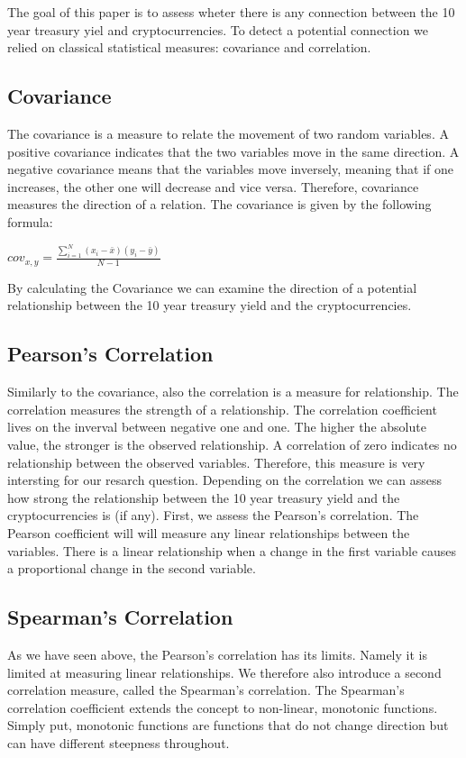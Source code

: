 The goal of this paper is to assess wheter there is any connection between the 10 year treasury yiel and cryptocurrencies. To detect a potential connection we relied on classical statistical measures: covariance and correlation.

\subsection{Covariance}
The covariance is a measure to relate the movement of two random variables. A positive covariance indicates that the two variables move in the same direction. A negative covariance means that the variables move inversely, meaning that if one increases, the other one will decrease and vice versa. Therefore, covariance measures the direction of a relation. The covariance is given by the following formula:
\begin{center}
   \large $cov_{x,y}=\frac{\sum_{i=1}^{N}(x_{i}-\bar{x})(y_{i}-\bar{y})}{N-1}$
\end{center}
By calculating the Covariance we can examine the direction of a potential relationship between the 10 year treasury yield and the cryptocurrencies.

\subsection{Pearson's Correlation}
Similarly to the covariance, also the correlation is a measure for relationship. The correlation measures the strength of a relationship. The correlation coefficient lives on the inverval between negative one and one. The higher the absolute value, the stronger is the observed relationship. A correlation of zero indicates no relationship between the observed variables. Therefore, this measure is very intersting for our resarch question. Depending on the correlation we can assess how strong the relationship between the 10 year treasury yield and the cryptocurrencies is (if any).
First, we assess the Pearson's correlation. The Pearson coefficient will will measure any linear relationships between the variables. There is a linear relationship when a change in the first variable causes a proportional change in the second variable.


\subsection{Spearman's Correlation}
As we have seen above, the Pearson's correlation has its limits. Namely it is limited at measuring linear relationships. We therefore also introduce a second correlation measure, called the Spearman's correlation. The Spearman’s correlation coefficient extends the concept to non-linear, monotonic functions. Simply put, monotonic functions are functions that do not change direction but can have different steepness throughout. 


